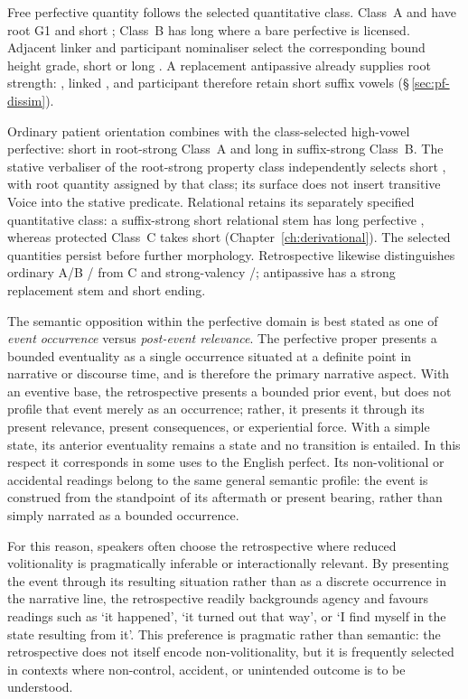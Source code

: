 Free perfective quantity follows the selected quantitative class.
Class~A   and  
have root G1 and short ; Class~B has long  where
a bare perfective is licensed. Adjacent linker  and participant
nominaliser  select the corresponding bound height grade,
short  or long . A replacement antipassive
already supplies root strength: , linked
, and participant  therefore
retain short suffix vowels (§\,\ref{sec:pf-dissim}).

Ordinary patient orientation combines  with the class-selected
high-vowel perfective: short  in root-strong Class~A and
long  in suffix-strong Class~B. The stative verbaliser
 of the root-strong property class independently selects short
, with root quantity assigned by that class; its surface
 does not insert transitive Voice into the stative predicate.
Relational  retains its separately specified quantitative
class: a suffix-strong short relational stem has long perfective
, whereas protected Class~C takes short 
(Chapter~\ref{ch:derivational}). The selected quantities
persist before further morphology. Retrospective likewise distinguishes
ordinary A/B / from C and strong-valency
/; antipassive  has a strong
replacement stem and short ending.

The semantic opposition within the perfective domain is best stated as one of
\emph{event occurrence} versus \emph{post-event relevance}. The perfective
proper presents a bounded eventuality as a single occurrence situated at a definite
point in narrative or discourse time, and is therefore the primary narrative
aspect. With an eventive base, the retrospective presents a bounded prior event, but does
not profile that event merely as an occurrence; rather, it presents it through
its present relevance, present consequences, or experiential force. With a simple state, its anterior eventuality remains a state and no transition
is entailed. In this respect it corresponds in some uses to the English perfect. Its non-volitional
or accidental readings belong to the same general semantic profile: the event is
construed from the standpoint of its aftermath or present bearing, rather than
simply narrated as a bounded occurrence.

For this reason, speakers often choose the retrospective where reduced
volitionality is pragmatically inferable or interactionally relevant. By
presenting the event through its resulting situation rather than as a discrete
occurrence in the narrative line, the retrospective readily backgrounds agency
and favours readings such as `it happened', `it turned out that way', or `I find
myself in the state resulting from it'. This preference is pragmatic rather
than semantic: the retrospective does not itself encode non-volitionality, but
it is frequently selected in contexts where non-control, accident, or
unintended outcome is to be understood.

